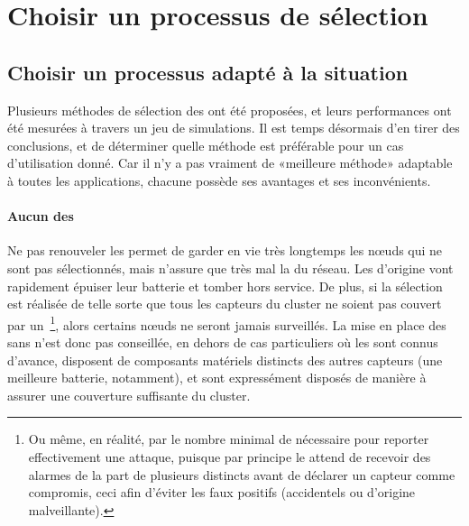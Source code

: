\section{Choisir un processus de sélection}

    \subsection{Choisir un processus adapté à la situation}
Plusieurs méthodes de sélection des \cns ont été proposées, et leurs performances ont été mesurées à travers un jeu de simulations.
Il est temps désormais d'en tirer des conclusions, et de déterminer quelle méthode est préférable pour un cas d'utilisation donné.
Car il n'y a pas vraiment de «meilleure méthode» adaptable à toutes les applications, chacune possède ses avantages et ses inconvénients.

\paragraph{Aucun  des \cns}
Ne pas renouveler les \cns permet de garder en vie très longtemps les nœuds qui ne sont pas sélectionnés, mais n'assure que très mal la \secu du réseau.
Les \cns d'origine vont rapidement épuiser leur batterie et tomber hors service.
De plus, si la sélection est réalisée de telle sorte que tous les capteurs du cluster ne soient pas couvert par un \cn\,\footnote{Ou même, en réalité, par le nombre minimal de \cns nécessaire pour reporter effectivement une attaque, puisque par principe le \ch attend de recevoir des alarmes de la part de plusieurs \cns distincts avant de déclarer un capteur comme compromis, ceci afin d'éviter les faux positifs (accidentels ou d'origine malveillante).}, alors certains nœuds ne seront jamais surveillés.
La mise en place des \cns sans  n'est donc pas conseillée, en dehors de cas particuliers où les \cns sont connus d'avance, disposent de composants matériels distincts des autres capteurs (une meilleure batterie, notamment), et sont expressément disposés de manière à assurer une couverture suffisante du cluster.

